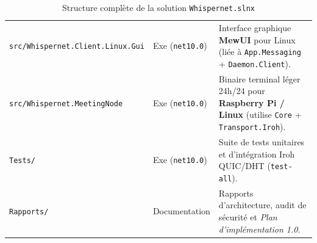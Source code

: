 \documentclass[11pt,a4paper]{article}
\begin{document}
\begin{table}[h!]
\begin{tabular}{@{}llp{6.2cm}@{}}
\texttt{src/Whispernet.Client.Linux.Gui} & Exe (\texttt{net10.0}) & Interface graphique \textbf{MewUI} pour Linux (liée à \texttt{App.Messaging} + \texttt{Daemon.Client}). \\
\texttt{src/Whispernet.MeetingNode} & Exe (\texttt{net10.0}) & Binaire terminal léger 24h/24 pour \textbf{Raspberry Pi / Linux} (utilise \texttt{Core} + \texttt{Transport.Iroh}). \\
\texttt{Tests/} & Exe (\texttt{net10.0}) & Suite de tests unitaires et d'intégration Iroh QUIC/DHT (\texttt{test-all}). \\
\texttt{Rapports/} & Documentation & Rapports d'architecture, audit de sécurité et \emph{Plan d'implémentation 1.0}. \\
\bottomrule
\end{tabular}
\caption{Structure complète de la solution \texttt{Whispernet.slnx}}
\end{table}
\end{document}
